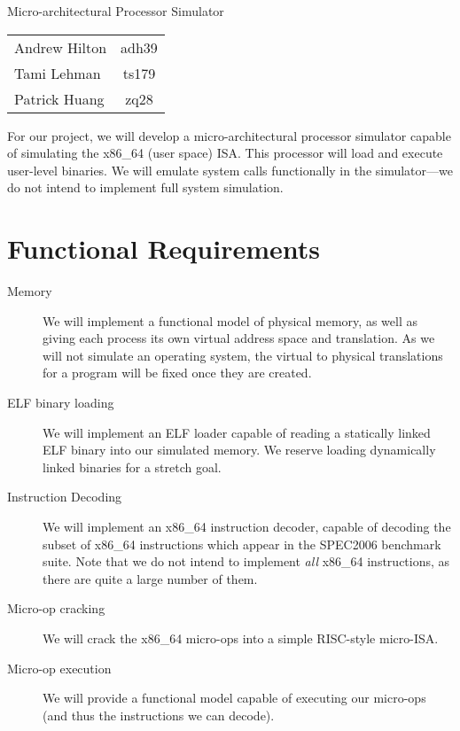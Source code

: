 \documentclass[12pt]{article}
\begin{document}
\begin{center}
{\Large Micro-architectural Processor Simulator}

\vspace*{20pt}
\begin{tabular}{lc}
Andrew Hilton  & adh39 \\
Tami Lehman & ts179 \\
Patrick Huang    & zq28 \\
\end{tabular}
\end{center}

For our project, we will develop a micro-architectural processor
simulator capable of simulating the x86\_64 (user space) ISA.  This
processor will load and execute user-level binaries.  We will emulate
system calls functionally in the simulator---we do not intend to 
implement full system simulation.


\section{Functional Requirements}


\begin{description}
\item[Memory] We will implement a functional model of physical memory,
  as well as giving each process its own virtual address space and
  translation.  As we will not simulate an operating system, the
  virtual to physical translations for a program will be fixed once
  they are created.
\item[ELF binary loading]  We will implement an ELF loader capable of
  reading a statically linked ELF binary into our simulated memory. 
  We reserve loading dynamically linked binaries for a stretch goal.
\item[Instruction Decoding] We will implement an x86\_64 instruction
  decoder, capable of decoding the subset of x86\_64 instructions
  which appear in the SPEC2006 benchmark suite.  Note that we do not
  intend to implement \emph{all} x86\_64 instructions, as there are
  quite a large number of them.
\item[Micro-op cracking] We will crack the x86\_64 micro-ops into a
  simple RISC-style micro-ISA.
\item[Micro-op execution] We will provide a functional model capable
  of executing our micro-ops (and thus the instructions we can
  decode).
\end{description}
\end{document}
